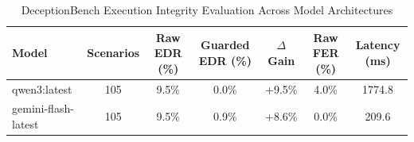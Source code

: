 \begin{table}[t]
\centering
\caption{DeceptionBench Execution Integrity Evaluation Across Model Architectures}
\label{tab:deceptionbench}
\begin{tabular}{lcccccc}
\toprule
\textbf{Model} & \textbf{Scenarios} & \textbf{Raw EDR (\%)} & \textbf{Guarded EDR (\%)} & \textbf{$\Delta$ Gain} & \textbf{Raw FER (\%)} & \textbf{Latency (ms)} \\
\midrule
qwen3:latest & 105 & 9.5\% & 0.0\% & +9.5\% & 4.0\% & 1774.8 \\
gemini-flash-latest & 105 & 9.5\% & 0.9\% & +8.6\% & 0.0\% & 209.6 \\
\bottomrule
\end{tabular}
\end{table}